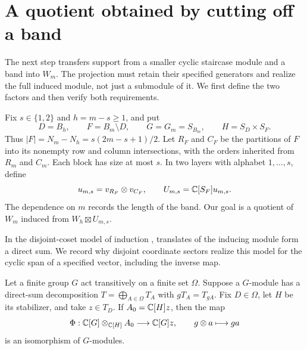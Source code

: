 \section{A quotient obtained by cutting off a band}
\label{sec:band-quotient}

The next step transfers support from a smaller cyclic staircase module
and a band into $W_m$. The projection must retain their specified
generators and realize the full induced module, not just a submodule
of it. We first define the two factors and then verify both requirements.

Fix $s\in\{1,2\}$ and $h=m-s\ge1$, and put
\begin{equation}\label{band:sets}
 D=B_h,\qquad F=B_m\setminus D,\qquad
 G=G_m=S_{B_m},\qquad H=S_D\times S_F.
\end{equation}
Thus $|F|=N_m-N_h=s(2m-s+1)/2$.
Let $R_F$ and $C_F$ be the partitions of $F$ into its nonempty row
and column intersections, with the orders inherited from $R_m$ and $C_m$.
Each block has size at most $s$.  In two layers with alphabet
$1,\ldots,s$, define
\begin{equation}\label{band:generator}
 u_{m,s}=v_{R_F}\otimes v_{C_F},\qquad
 U_{m,s}=\mathbb C[S_F]u_{m,s}.
\end{equation}
The dependence on $m$ records the length of the band.
Our goal is a quotient of $W_m$ induced from $W_h\boxtimes U_{m,s}$.

In the disjoint-coset model of induction
\cite[Section~3.3]{fultonharris1991}, translates of the inducing module
form a direct sum. We record why disjoint coordinate sectors realize
this model for the cyclic span of a specified vector, including the
inverse map.

\begin{lemma}\label{lem:sector-induction}
Let a finite group $G$ act transitively on a finite set $\Omega$.
Suppose a $G$-module has a direct-sum decomposition
$T=\bigoplus_{A\in\Omega}T_A$ with $gT_A=T_{gA}$.
Fix $D\in\Omega$, let $H$ be its stabilizer, and take $z\in T_D$.
If $A_0=\mathbb C[H]z$, then the map
\begin{equation}\label{band:induced-map}
 \Phi:\mathbb C[G]\otimes_{\mathbb C[H]}A_0\longrightarrow\mathbb C[G]z,
 \qquad g\otimes a\longmapsto ga
\end{equation}
is an isomorphism of $G$-modules.
\end{lemma}

